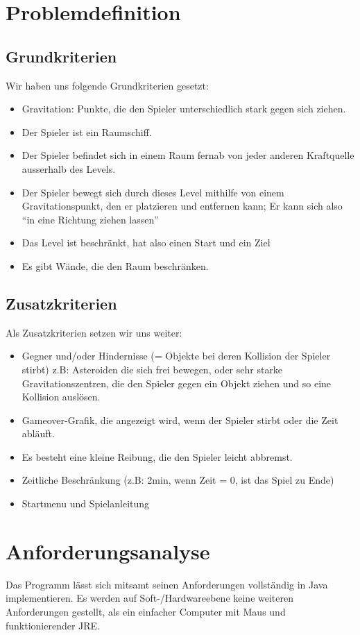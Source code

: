 \documentclass[12pt,a4paper]{scrartcl}
\newcommand{\q}[1]{``#1''}
\begin{document}
\section{Problemdefinition}
\subsection{Grundkriterien}
Wir haben uns folgende Grundkriterien gesetzt:
\begin{itemize}
\item Gravitation: Punkte, die den Spieler unterschiedlich stark gegen sich ziehen.
\item Der Spieler ist ein Raumschiff.
\item Der Spieler befindet sich in einem Raum fernab von jeder anderen Kraftquelle ausserhalb des Levels.
\item Der Spieler bewegt sich durch dieses Level mithilfe von  einem Gravitationspunkt, den er platzieren und entfernen kann; Er kann sich also \q{in eine Richtung ziehen lassen}
\item Das Level ist beschränkt, hat also einen Start und ein Ziel
\item Es gibt Wände, die den Raum beschränken.
\end{itemize}

\subsection{Zusatzkriterien}
Als Zusatzkriterien setzen wir uns weiter:
\begin{itemize}
\item Gegner und/oder Hindernisse (= Objekte bei deren Kollision der Spieler stirbt) z.B: Asteroiden die sich frei bewegen, oder sehr starke Gravitationszentren, die den Spieler gegen ein Objekt ziehen und so eine Kollision auslösen.
\item Gameover-Grafik, die angezeigt wird, wenn der Spieler stirbt oder die Zeit abläuft.
\item Es besteht eine kleine Reibung, die den Spieler leicht abbremst.
\item Zeitliche Beschränkung (z.B: 2min, wenn Zeit = 0, ist das Spiel zu Ende)
\item Startmenu und Spielanleitung
\end{itemize}




\section{Anforderungsanalyse}
Das Programm lässt sich mitsamt seinen Anforderungen vollständig in Java implementieren.
Es werden auf Soft-/Hardwareebene keine weiteren Anforderungen gestellt, als ein einfacher Computer mit
Maus und funktionierender JRE.
\end{document}
